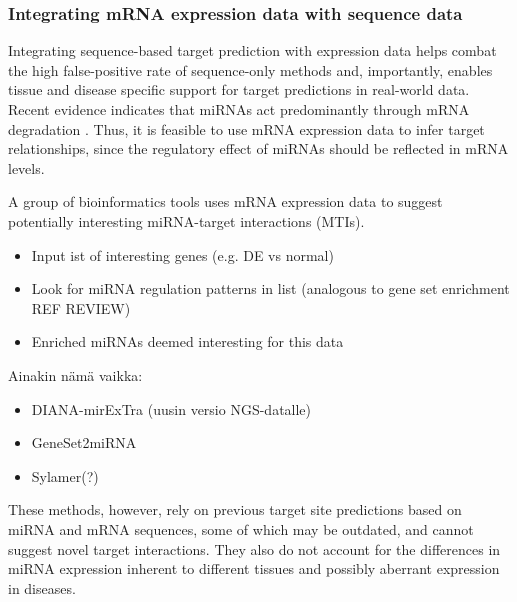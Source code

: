 





\subsubsection{Integrating mRNA expression data with sequence data}

Integrating sequence-based target prediction with expression data helps combat the
high false-positive rate of sequence-only methods and, importantly, enables tissue and
disease specific support for target predictions in real-world data. Recent
evidence indicates that miRNAs act predominantly through mRNA degradation
\citep{Guo2010}. Thus, it is feasible to use mRNA expression data to
infer target relationships, since the regulatory effect of miRNAs should be
reflected in mRNA levels.

A group of bioinformatics tools uses mRNA expression data to suggest
potentially interesting miRNA-target interactions (MTIs).
\begin{itemize}
  \item
  Input ist of interesting genes (e.g. DE vs normal)
  \item
  Look for miRNA regulation patterns in list (analogous to gene set enrichment REF REVIEW)
  \item
  Enriched miRNAs deemed interesting for this data
\end{itemize}



Ainakin nämä vaikka:
\begin{itemize}
  \item
  DIANA-mirExTra (uusin versio NGS-datalle)
  \item
  GeneSet2miRNA
  \item
  Sylamer(?)
\end{itemize}

These methods, however, rely on previous target site predictions based on
miRNA and mRNA sequences, some of which may be outdated, and 
cannot suggest novel target interactions. They also do not account for
the differences in miRNA expression inherent to different tissues and
possibly aberrant expression in diseases.


